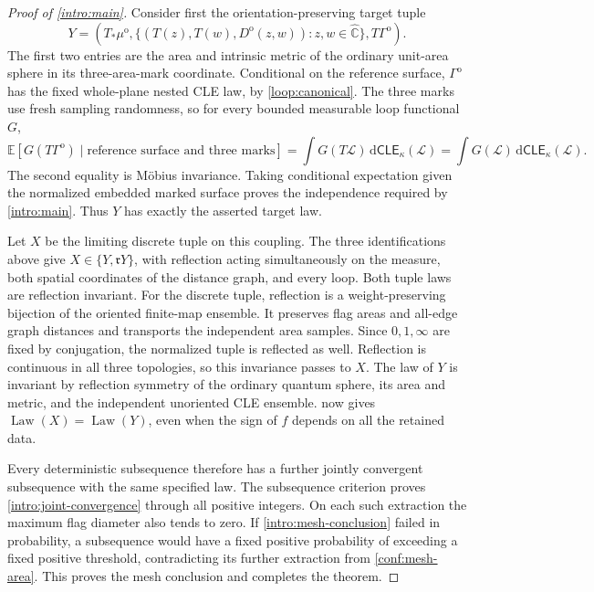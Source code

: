 \documentclass[11pt]{article}
\numberwithin{equation}{section}
\theoremstyle{definition}
\theoremstyle{remark}
\newcommand{\EE}{\mathbb E}
\newcommand{\Chat}{\widehat{\mathbb C}}
\newcommand{\dd}{\mathrm d}
\newcommand{\1}{\mathbf 1}
\DeclareMathOperator{\Law}{Law}
\begin{document}
\begin{proof}[Proof of \cref{intro:main}]
Consider first the orientation-preserving target tuple
\[
 Y=\left(T_*\mu^{\mathrm o},
   \{(T(z),T(w),D^{\mathrm o}(z,w)):z,w\in\Chat\},
   T\Gamma^{\mathrm o}\right).
\]
The first two entries are the area and intrinsic metric of the ordinary
unit-area sphere in its three-area-mark coordinate. Conditional on the
reference surface, $\Gamma^{\mathrm o}$ has the fixed whole-plane
nested CLE law, by \cref{loop:canonical}. The three marks use fresh
sampling randomness, so for every bounded measurable loop functional
$G$,
\[
 \EE[G(T\Gamma^{\mathrm o})\mid
           \text{reference surface and three marks}]
 =\int G(T\mathcal L)\,\dd\mathsf{CLE}_{\kappa}(\mathcal L)
 =\int G(\mathcal L)\,\dd\mathsf{CLE}_{\kappa}(\mathcal L).
\]
The second equality is M\"obius invariance. Taking conditional
expectation given the normalized embedded marked surface proves the
independence required by \cref{intro:main}. Thus $Y$ has exactly the
asserted target law.

Let $X$ be the limiting discrete tuple on this coupling. The three
identifications above give $X\in\{Y,\mathfrak r Y\}$, with reflection
acting simultaneously on the measure, both spatial coordinates of the
distance graph, and every loop. Both tuple laws are reflection invariant.
For the discrete tuple, reflection is a weight-preserving bijection of
the oriented finite-map ensemble. It preserves flag areas and all-edge
graph distances and transports the independent area samples. Since
$0,1,\infty$ are fixed by conjugation, the normalized tuple is reflected
as well. Reflection is continuous in all three topologies, so this
invariance passes to $X$. The law of $Y$ is invariant by reflection
symmetry of the ordinary quantum sphere, its area and metric, and the
independent unoriented CLE ensemble.  now gives
$\Law(X)=\Law(Y)$, even when the sign of $f$ depends on all the retained
data.

Every deterministic subsequence therefore has a further jointly
convergent subsequence with the same specified law. The subsequence
criterion proves \eqref{intro:joint-convergence} through all positive
integers. On each such extraction the maximum flag diameter also tends
to zero. If \eqref{intro:mesh-conclusion} failed in probability, a
subsequence would have a fixed positive probability of exceeding a
fixed positive threshold, contradicting its further extraction from
\cref{conf:mesh-area}. This proves the mesh conclusion and completes
the theorem.
\end{proof}


\let\originalbibsection\bibsection
\renewcommand{\bibsection}{
  \originalbibsection
  \addcontentsline{toc}{section}{\refname}}

\end{document}
